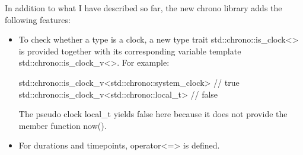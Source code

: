 In addition to what I have described so far, the new chrono library adds the following features:


\begin{itemize}
\item 
To check whether a type is a clock, a new type trait std::chrono::is\_clock<> is provided together with its corresponding variable template std::chrono::is\_clock\_v<>. For example:

\begin{cpp}
std::chrono::is_clock_v<std::chrono::system_clock> // true
std::chrono::is_clock_v<std::chrono::local_t> // false
\end{cpp}

The pseudo clock local\_t yields false here because it does not provide the member function now().

\item 
For durations and timepoints, operator<=> is defined.
\end{itemize}